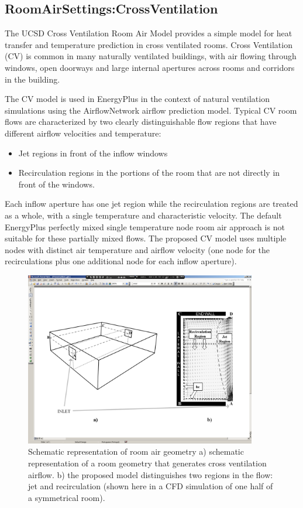 \subsection{RoomAirSettings:CrossVentilation}\label{roomairsettingscrossventilation}

The UCSD Cross Ventilation Room Air Model provides a simple model for heat transfer and temperature prediction in cross ventilated rooms. Cross Ventilation (CV) is common in many naturally ventilated buildings, with air flowing through windows, open doorways and large internal apertures across rooms and corridors in the building.

The CV model is used in EnergyPlus in the context of natural ventilation simulations using the AirflowNetwork airflow prediction model. Typical CV room flows are characterized by two clearly distinguishable flow regions that have different airflow velocities and temperature:

\begin{itemize}
\item
  Jet regions in front of the inflow windows
\item
  Recirculation regions in the portions of the room that are not directly in front of the windows.
\end{itemize}

Each inflow aperture has one jet region while the recirculation regions are treated as a whole, with a single temperature and characteristic velocity. The default EnergyPlus perfectly mixed single temperature node room air approach is not suitable for these partially mixed flows. The proposed CV model uses multiple nodes with distinct air temperature and airflow velocity (one node for the recirculations plus one additional node for each inflow aperture).

\begin{figure}[hbtp] %
\centering
\includegraphics[width=0.9\textwidth, height=0.9\textheight, keepaspectratio=true]{media/image081.png}
\caption{Schematic representation of room air geometry a) schematic representation of a room geometry that generates cross ventilation airflow. b) the proposed model distinguishes two regions in the flow: jet and recirculation (shown here in a CFD simulation of one half of a symmetrical room). \protect \label{fig:schematic-representation-of-room-air-geometry}}
\end{figure}

